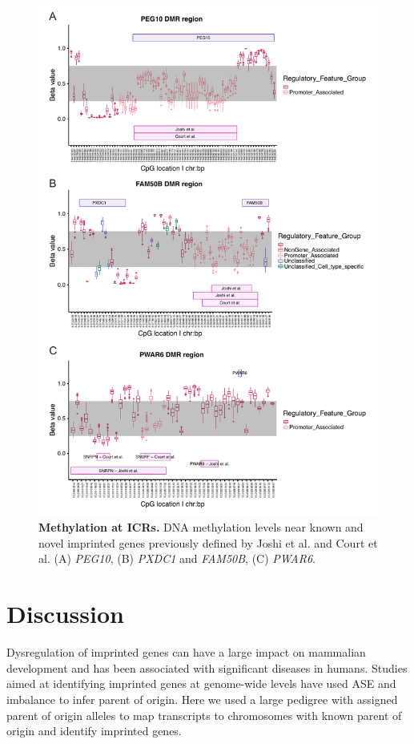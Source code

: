 \begin{figure}[!htb]
\centering \includegraphics[width=5in]{img/ch03/fig-03.pdf}
\caption[Methylation at ICRs.]{\textbf{Methylation at ICRs.} DNA methylation levels near known and novel imprinted genes previously defined by Joshi et al. and Court et al. (A) \emph{PEG10}, (B) \emph{PXDC1} and \emph{FAM50B}, (C) \emph{PWAR6}.}
\label{fig:methylation}
\end{figure}


\section{Discussion}\label{ch03-discussion}
Dysregulation of imprinted genes can have a large impact on mammalian development and has been associated with significant diseases in humans. Studies aimed at identifying imprinted genes at genome-wide levels have used ASE and imbalance to infer parent of origin. Here we used a large pedigree with assigned parent of origin alleles to map transcripts to chromosomes with known parent of origin and identify imprinted genes. 


